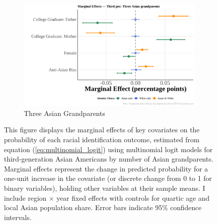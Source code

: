 \begin{center}
\begin{figure}[!htb]
\begin{subfigure}{.45\textwidth}
\caption{Three Asian Grandparents}\label{subfig:threeasiangrand}
\centering
\includegraphics[width=1\linewidth]{optimized_marginal_effects_third_three.png}
\end{subfigure}
\caption*{\footnotesize{This figure displays the marginal effects of key covariates on the probability of each racial identification outcome, estimated from equation (\ref{eq:multinomial_logit}) using multinomial logit models for third-generation Asian Americans by number of Asian grandparents. Marginal effects represent the change in predicted probability for a one-unit increase in the covariate (or discrete change from 0 to 1 for binary variables), holding other variables at their sample means. I include region $\times$ year fixed effects with controls for quartic age and local Asian population share. Error bars indicate 95\% confidence intervals.}}
\end{figure}
\end{center}

\pagebreak
\newpage
